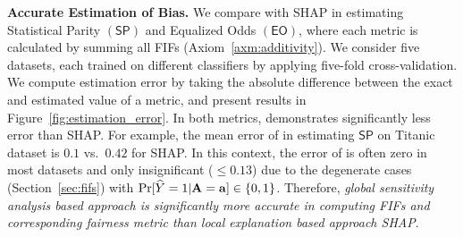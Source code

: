 \noindent\textbf{Accurate Estimation of Bias.} We compare {\fairXplainer} with SHAP in estimating Statistical Parity $(\mathsf{SP})$ and Equalized Odds $(\mathsf{EO})$, where each metric is calculated by summing all FIFs (Axiom~\ref{axm:additivity}). We consider five datasets, each trained on different classifiers by applying five-fold cross-validation. We compute estimation error by taking the absolute difference between the exact and  estimated value of a metric, and present results in Figure~\ref{fig:estimation_error}. In both metrics, {\fairXplainer} demonstrates significantly less error than SHAP. For example, the mean error of {\fairXplainer} in estimating $ \mathsf{SP} $ on Titanic dataset is $ 0.1 $ vs.\ $ 0.42 $ for SHAP. In this context, the error of {\fairXplainer} is often zero in most datasets and only insignificant ($ \le 0.13 $) due to the degenerate cases (Section~\ref{sec:fifs}) with $ \Pr[\widehat{Y} = 1 | \mathbf{A} = \mathbf{a}] \in \{0, 1\} $.  Therefore, \emph{global sensitivity analysis based approach {\fairXplainer} is significantly more accurate in computing FIFs and corresponding fairness metric than local explanation based approach SHAP}.


